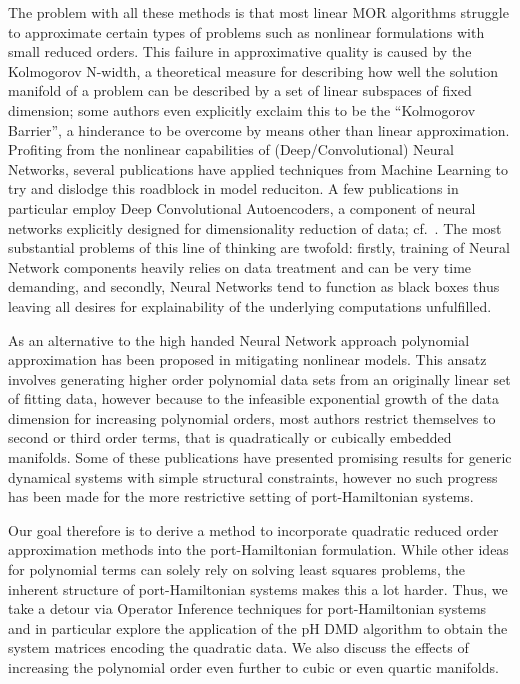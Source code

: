 The problem with all these methods is that most linear MOR algorithms struggle to approximate certain types of problems such as nonlinear formulations with small reduced orders.
This failure in approximative quality is caused by the Kolmogorov N-width, a theoretical measure for describing how well the solution manifold of a problem can be described by a set of linear subspaces of fixed dimension; some authors even explicitly exclaim this to be the ``Kolmogorov Barrier'', a hinderance to be overcome by means other than linear approximation.
Profiting from the nonlinear capabilities of (Deep/Convolutional) Neural Networks, several publications have applied techniques from Machine Learning to try and dislodge this roadblock in model reduciton.
A few publications in particular employ Deep Convolutional Autoencoders, a component of neural networks explicitly designed for dimensionality reduction of data; cf.~\cite{Lee2020, Romor2022, Buchfink2023}.
The most substantial problems of this line of thinking are twofold: firstly, training of Neural Network components heavily relies on data treatment and can be very time demanding, and secondly, Neural Networks tend to function as black boxes thus leaving all desires for explainability of the underlying computations unfulfilled.

As an alternative to the high handed Neural Network approach polynomial approximation has been proposed in mitigating nonlinear models.
This ansatz involves generating higher order polynomial data sets from an originally linear set of fitting data, however because to the infeasible exponential growth of the data dimension for increasing polynomial orders, most authors restrict themselves to second or third order terms, that is quadratically or cubically embedded manifolds.
Some of these publications have presented promising results for generic dynamical systems with simple structural constraints, however no such progress has been made for the more restrictive setting of port-Hamiltonian systems.


Our goal therefore is to derive a method to incorporate quadratic reduced order approximation methods into the port-Hamiltonian formulation.
While other ideas for polynomial terms can solely rely on solving least squares problems, the inherent structure of port-Hamiltonian systems makes this a lot harder.
Thus, we take a detour via Operator Inference techniques for port-Hamiltonian systems and in particular explore the application of the pH DMD algorithm to obtain the system matrices encoding the quadratic data.
We also discuss the effects of increasing the polynomial order even further to cubic or even quartic manifolds.

